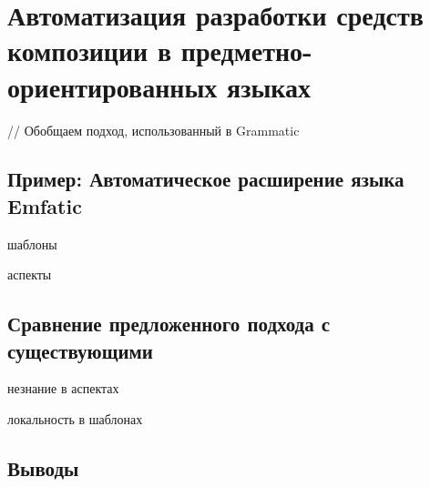 \part{Автоматизация разработки средств композиции в предметно-ориентированных языках}\label{part4}

// Обобщаем подход, использованный в Grammatic





\chapter{Пример: Автоматическое расширение языка Emfatic}

шаблоны

аспекты

\chapter{Сравнение предложенного подхода с существующими}

незнание в аспектах

локальность в шаблонах

\chapter{Выводы}
